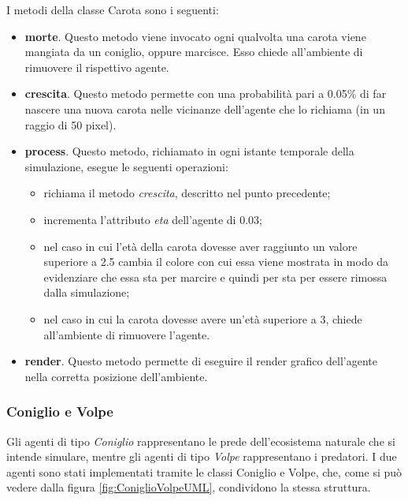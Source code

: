 \documentclass[11pt]{article}
\begin{document}
I metodi della classe Carota sono i seguenti:
\begin{itemize}
    \item \textbf{morte}. Questo metodo viene invocato ogni qualvolta una carota viene mangiata da un coniglio, oppure marcisce. Esso chiede all'ambiente di rimuovere il rispettivo agente. 
    \item \textbf{crescita}. Questo metodo permette con una probabilità pari a 0.05\% di far nascere una nuova carota nelle vicinanze dell'agente che lo richiama (in un raggio di 50 pixel).
    \item \textbf{process}. Questo metodo, richiamato in ogni istante temporale della simulazione, esegue le seguenti operazioni: 
    \begin{itemize}
        \item richiama il metodo \emph{crescita}, descritto nel punto precedente;
        \item incrementa l'attributo \emph{eta} dell'agente di 0.03;
        \item nel caso in cui l'età della carota dovesse aver raggiunto un valore superiore a 2.5 cambia il colore con cui essa viene mostrata in modo da evidenziare che essa sta per marcire e quindi per sta per essere rimossa dalla simulazione;
        \item nel caso in cui la carota dovesse avere un'età superiore a 3, chiede all'ambiente di rimuovere l'agente. 
    \end{itemize}
    \item \textbf{render}. Questo metodo permette di eseguire il render grafico dell'agente nella corretta posizione dell'ambiente. 
\end{itemize}
\subsubsection{Coniglio e Volpe}
Gli agenti di tipo \emph{Coniglio} rappresentano le prede dell'ecosistema naturale che si intende simulare, mentre gli agenti di tipo \emph{Volpe} rappresentano i predatori. I due agenti sono stati implementati tramite le classi Coniglio e Volpe, che, come si può vedere dalla figura \ref{fig:ConiglioVolpeUML}, condividono la stessa struttura. 
\end{document}
